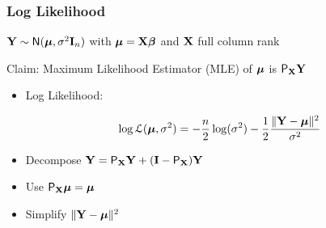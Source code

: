 \documentclass{beamer}
\begin{document}
\begin{frame}
  \frametitle{Log Likelihood}
     $\mathbf{Y} \sim \textsf{N}(\boldsymbol{\mu}, \sigma^2 \mathbf{I}_n)$ with 
    $\boldsymbol{\mu} = \mathbf{X} \boldsymbol{\beta}$  and $\mathbf{X}$ full column rank \\ \pause

 Claim: Maximum Likelihood Estimator (MLE) of $\boldsymbol{\mu}$ is
    $\textsf{P}_{\mathbf{X}} \mathbf{Y}$  \pause

  \begin{itemize}
\item Log Likelihood:  \pause

$$ \log {\cal{L}}(\boldsymbol{\mu}, \sigma^2) =
-\frac{n}{2} \log(\sigma^2) 
  - \frac 1 2 \frac{\| \mathbf{Y} - \boldsymbol{\mu} \|^2}{\sigma^2} 
$$  \pause
\item Decompose $\mathbf{Y} = \textsf{P}_{\mathbf{X}} \mathbf{Y} + (\mathbf{I} - \textsf{P}_{\mathbf{X}}) \mathbf{Y}$  \pause
\item Use $\textsf{P}_{\mathbf{X}} \boldsymbol{\mu} = \boldsymbol{\mu}$  \pause
\item Simplify $\| \mathbf{Y} - \boldsymbol{\mu} \|^2$
  \end{itemize}

\end{frame}
\end{document}
